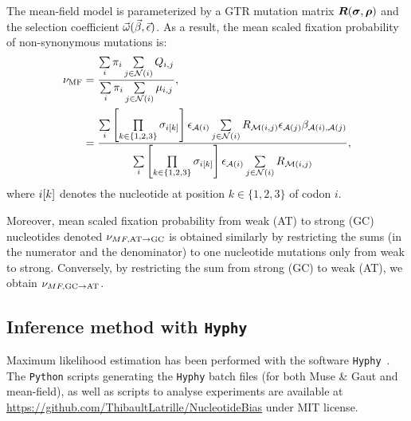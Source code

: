 The mean-field model is parameterized by a GTR mutation matrix $\bm{R}(\bm{\sigma}, \bm{\rho})$ and the selection coefficient $\vec{\omega}(\vec{\beta}, \vec{\epsilon})$.
As a result, the mean scaled fixation probability of non-synonymous mutations is:
\begin{align}
    \nu_{\text{MF}} & = \dfrac{ \sum\limits_{{i}} \pi_{{i}} \sum\limits_{{j} \in \mathcal{N}\left({i}\right)} Q_{{i}, {j}}}{ \sum\limits_{{i}} \pi_{{i}} \sum\limits_{{j} \in \mathcal{N}\left({i}\right)} \mu_{{i}, {j}}}, \\
    & = \dfrac{ \sum\limits_{{i}} \left[\prod\limits_{k \in \{ 1, 2, 3 \}} \sigma_{{i}[k]}\right] \epsilon_{\mathcal{A}({i})} \sum\limits_{{j} \in \mathcal{N}\left({i}\right)} R_{\mathcal{M}({i}, {j})} \epsilon_{\mathcal{A}({j})} \beta_{\mathcal{A}({i}), \mathcal{A}({j})} }{\sum\limits_{{i}} \left[\prod\limits_{k \in \{ 1, 2, 3 \}} \sigma_{{i}[k]}\right] \epsilon_{\mathcal{A}({i})} \sum\limits_{{j} \in \mathcal{N}\left({i}\right)} R_{\mathcal{M}({i}, {j})}},
\end{align}
where ${i}[k]$ denotes the nucleotide at position $k \in \{ 1, 2, 3 \}$ of codon $i$.

Moreover, mean scaled fixation probability from weak (AT) to strong (GC) nucleotides denoted $\nu_{MF, \text{AT} \rightarrow \text{GC}}$ is obtained similarly by restricting the sums (in the numerator and the denominator) to one nucleotide mutations only from weak to strong.
Conversely, by restricting the sum from strong (GC) to weak (AT), we obtain $\nu_{MF, \text{GC} \rightarrow \text{AT}}$.

\subsection{Inference method with \texttt{Hyphy}}
\label{subsec:inference-method-with-hyphy}

Maximum likelihood estimation has been performed with the software \texttt{Hyphy}~\citep{Pond2005}.
The \texttt{Python} scripts generating the \texttt{Hyphy} batch files (for both Muse \& Gaut and mean-field), as well as scripts to analyse experiments are available at \url{https://github.com/ThibaultLatrille/NucleotideBias} under MIT license.
